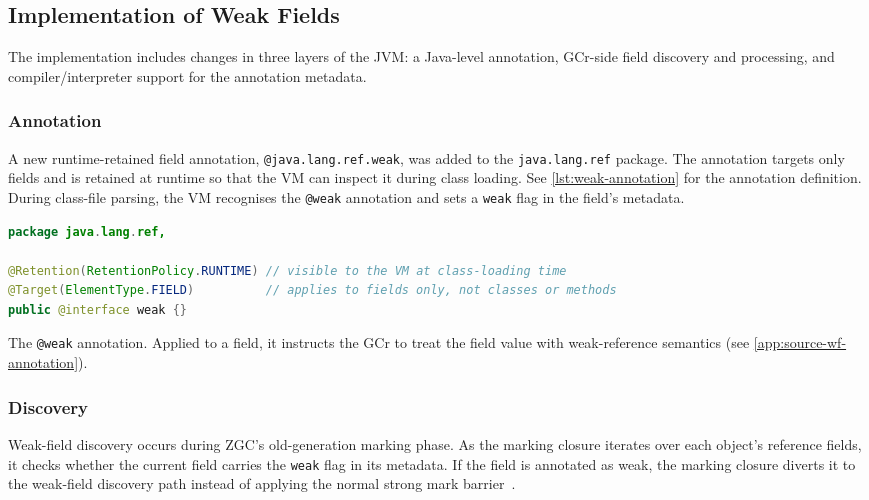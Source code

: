 \subsection{Implementation of Weak Fields}
\label{subsec:di-wf-impl}

The implementation includes changes in three layers of the \ac{JVM}: a Java-level annotation, \ac{GCr}-side field discovery and processing, and compiler/interpreter support for the annotation metadata.

\subsubsection{Annotation}

A new runtime-retained field annotation, \texttt{@java.lang.ref.weak}, was added to the \texttt{java.lang.ref} package. The annotation targets only fields and is retained at runtime so that the VM can inspect it during class loading. See \cref{lst:weak-annotation} for the annotation definition. During class-file parsing, the VM recognises the \texttt{@weak} annotation and sets a \texttt{weak} flag in the field's metadata.

\begin{listing}[t]
\begin{lstlisting}[language=Java]
package java.lang.ref,

@Retention(RetentionPolicy.RUNTIME) // visible to the VM at class-loading time
@Target(ElementType.FIELD)          // applies to fields only, not classes or methods
public @interface weak {}
\end{lstlisting}
\caption[Weak-field annotation]{The \texttt{@weak} annotation. Applied to a field, it instructs the \ac{GCr} to treat the field value with weak-reference semantics (see \cref{app:source-wf-annotation}).}
\label{lst:weak-annotation}
\end{listing}

\subsubsection{Discovery}

Weak-field discovery occurs during \ac{ZGC}'s old-generation marking phase. As the marking closure iterates over each object's reference fields, it checks whether the current field carries the \texttt{weak} flag in its metadata. If the field is annotated as weak, the marking closure diverts it to the weak-field discovery path instead of applying the normal strong mark barrier~\cite{openjdk-zreferenceprocessor-cpp}.

